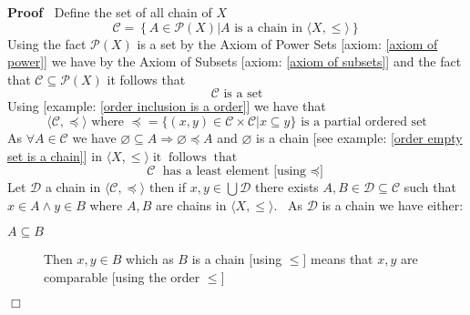 \documentclass{book}
\newcommand{\tmop}[1]{\ensuremath{\operatorname{#1}}}
\newenvironment{proof}{\noindent\textbf{Proof\ }}{\hspace*{\fill}$\Box$\medskip}
\begin{document}
\begin{proof}
  Define the set of all chain of $X$
  \[ \mathcal{C}= \left\{ A \in \mathcal{P} (X) |A \text{ is a chain in }
     \langle X, \leqslant \rangle \right\} \]
  Using the fact $\mathcal{P} (X)$ is a set by the Axiom of Power Sets [axiom:
  \ref{axiom of power}] we have by the Axiom of Subsets [axiom: \ref{axiom of
  subsets}] and the fact that $\mathcal{C} \subseteq \mathcal{P} (X)$ it
  follows that
  \begin{equation}
    \label{eq 3.61.018} \mathcal{C} \text{ is a set}
  \end{equation}
  Using [example: \ref{order inclusion is a order}] we have that
  \[ \langle \mathcal{C}, \preccurlyeq \rangle \text{ where } \preccurlyeq =
     \{ (x, y) \in \mathcal{C} \times \mathcal{C}|x \subseteq y \} \text{ is a
     partial ordered set} \]
  As $\forall A \in \mathcal{C}$ we have $\varnothing \subseteq A \Rightarrow
  \varnothing \preccurlyeq A$ and $\varnothing$ is a chain [see example:
  \ref{order empty set is a chain}] in $\langle X, \leqslant \rangle \text{}
  \tmop{it} \tmop{follows} \tmop{that} \text{}$
  \begin{equation}
    \label{eq 3.62.018} \mathcal{C} \text{ has a least element [using
    $\preccurlyeq$]}
  \end{equation}
  Let $\mathcal{D}$ a chain in $\langle \mathcal{C}, \preccurlyeq \rangle$
  then if $x, y \in \bigcup \mathcal{D}$ there exists $A, B \in \mathcal{D}
  \subseteq \mathcal{C}$ such that $x \in A \wedge y \in B$ where $A, B$ are
  chains in $\langle X, \leqslant \rangle$. \ As $\mathcal{D}$ is a chain we
  have either:
  \begin{description}
    \item[$A \subseteq B$] Then $x, y \in B$ which as $B$ is a chain [using
    $\leqslant$] means that $x, y$ are comparable [using the order
    $\leqslant$]
    

\end{description}
\end{proof}
\end{document}
